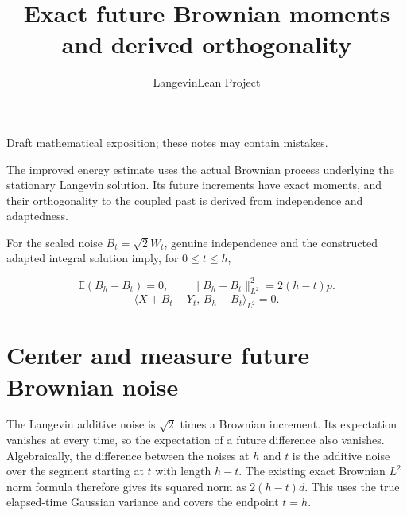 \documentclass[11pt,a4paper]{article}
\title{\texorpdfstring{Exact future Brownian moments and derived orthogonality}{Exact future Brownian moments and derived orthogonality}}
\author{LangevinLean Project}
\date{}
\begin{document}
\maketitle
Draft mathematical exposition; these notes may contain mistakes.


The improved energy estimate uses the actual Brownian process underlying the stationary Langevin solution. Its future increments have exact moments, and their orthogonality to the coupled past is derived from independence and adaptedness.



For the scaled noise \(B_t=\sqrt2W_t\), genuine independence and the constructed adapted integral solution imply, for \(0\le t\le h\),


\[\mathbb E(B_h-B_t)=0,\qquad\|B_h-B_t\|_{L^2}^{2}=2(h-t)p.\]
\[\langle X+B_t-Y_t,\,B_h-B_t\rangle_{L^2}=0.\]
\section{\texorpdfstring{Center and measure future Brownian noise}{Center and measure future Brownian noise}}


The Langevin additive noise is \(\sqrt 2\) times a Brownian increment. Its expectation vanishes at every time, so the expectation of a future difference also vanishes. Algebraically, the difference between the noises at \(h\) and \(t\) is the additive noise over the segment starting at \(t\) with length \(h-t\). The existing exact Brownian \(L^{2}\) norm formula therefore gives its squared norm as \(2(h-t)d\). This uses the true elapsed-time Gaussian variance and covers the endpoint \(t=h\).
\end{document}
